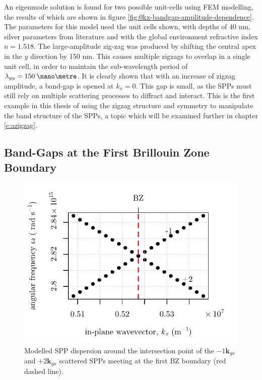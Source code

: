 An eigenmode solution is found for two possible unit-cells using FEM modelling, the results of which are shown in figure \ref{fig:0kx-bandgap-amplitude-dependence}.
The parameters for this model used the unit cells shown, with depths of 40 nm, silver parameters from literature \cite{Nash1996} and with the global environment refractive index $n=1.518$. The large-amplitude zig-zag was produced by shifting the central apex in the $y$ direction by 150 nm. This causes multiple zigzags to overlap in a single unit cell, in order to maintain the sub-wavelength period of $\lambda_{gy}=150\:\nano\metre$. It is clearly shown that with an increase of zigzag amplitude, a band-gap is opened at $k_x=0$. This gap is small, as the SPPs must still rely on multiple scattering processes to diffract and interact. This is the first example in this thesis of using the zigzag structure and symmetry to manipulate the band structure of the SPPs, a topic which will be examined further in chapter \ref{c:azigzag}.

\subsection{Band-Gaps at the First Brillouin Zone Boundary}

\begin{figure}
	\begin{center}
	\includegraphics[]{band-gap-figures/2kg-kg-dispersion.pdf}
	\end{center}	
\caption[Modelled SPP dispersion around the intersection point of the $-1\mathbf{k}_{gx}$ and $+2\mathbf{k}_{gx}$ scattered SPPs meeting at the first BZ boundary.]{Modelled SPP dispersion around the intersection point of the $-1\mathbf{k}_{gx}$ and $+2\mathbf{k}_{gx}$ scattered SPPs meeting at the first BZ boundary (red dashed line). \label{fig:zzeigen1stBZ}}
\end{figure}

